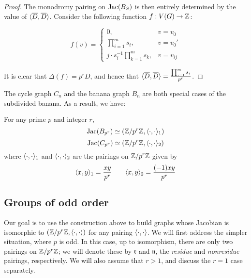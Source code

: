 \documentclass{amsart}
\begin{document}
\begin{proof}
  The monodromy pairing on $\operatorname{Jac}(B_S)$ is then entirely determined by
  the value of $\langle \overline{D}, \overline{D} \rangle$. Consider the
  following function $f:V(G) \to \mathbb{Z}$:

  \begin{equation*}
    f(v) = 
    \begin{cases}
      0, & v = v_0 \\
      \prod_{i=1}^ms_i, & v = v_0' \\
      j \cdot s_i^{-1}\prod_{k=1}^ms_k, & v = v_{ij}
    \end{cases}
  \end{equation*}

  It is clear that $\Delta(f) = p^rD$, and hence that
  $\langle \overline{D}, \overline{D} \rangle = \frac{\prod_{i=1}^ms_i}{p^r}$.
\end{proof}

The cycle graph $C_n$ and the banana graph $B_n$ are both special
cases of the subdivided banana. As a result, we have:

\begin{cor}
  For any prime $p$ and integer $r$, 
  \begin{equation*}
    \operatorname{Jac}(B_{p^r}) \simeq (\mathbb{Z}/p^r\mathbb{Z}, \langle \cdot, \cdot \rangle_1)
  \end{equation*}
  \begin{equation*}
    \operatorname{Jac}(C_{p^r}) \simeq (\mathbb{Z}/p^r\mathbb{Z}, \langle \cdot, \cdot \rangle_2)
  \end{equation*}
  where $\langle \cdot, \cdot \rangle_1$ and $\langle \cdot, \cdot \rangle_2$ are the
  pairings on $\mathbb{Z}/p^r\mathbb{Z}$ given by
  \begin{equation*}
    \langle x, y \rangle_1 = \frac{xy}{p^r} \qquad \langle x, y \rangle_2 = \frac{(-1)xy}{p^r}
  \end{equation*}
\end{cor}

\subsection{Groups of odd order}
\label{sec:odd_groups}

Our goal is to use the construction above to build graphs whose
Jacobian is isomorphic to $(\mathbb{Z}/p^r\mathbb{Z}, \langle \cdot, \cdot \rangle)$ for any
pairing $\langle \cdot, \cdot \rangle$. We will first address the simpler
situation, where $p$ is odd. In this case, up to isomorphism, there
are only two pairings on $\mathbb{Z}/p^r\mathbb{Z}$; we will denote these by
$\mathfrak{r}$ and $\mathfrak{n}$, the \emph{residue} and
\emph{nonresidue} pairings, respectively. We will also assume that $r
> 1$, and discuss the $r=1$ case separately. 
\end{document}
